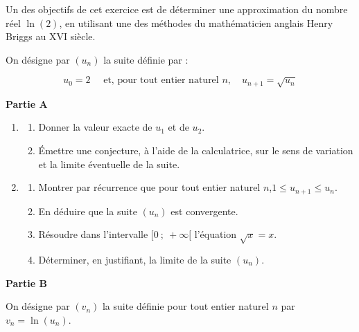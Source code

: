 \medskip

Un des objectifs de cet exercice est de déterminer une approximation du nombre réel $\ln(2)$, en utilisant une des méthodes du mathématicien anglais Henry Briggs au XVI siècle.

\bigskip

On désigne par $\left(u_{n}\right)$ la suite définie par :

\[u_{0}=2 \quad \text { et, pour tout entier naturel } n,\quad  u_{n+1}=\sqrt{u_{n}}\]

\medskip

\textbf{Partie A}

\medskip

\begin{enumerate}
\item 
	\begin{enumerate}
		\item Donner la valeur exacte de $u_{1}$ et de $u_{2}$.
		\item Émettre une conjecture, à l'aide de la calculatrice, sur le sens de variation et la limite éventuelle de la suite.
	\end{enumerate}
\item 
	\begin{enumerate}
		\item Montrer par récurrence que pour tout entier naturel $n$,\quad $1 \leqslant u_{n+1} \leqslant u_{n}$.
		\item En déduire que la suite $\left(u_{n}\right)$ est convergente.
		\item Résoudre dans l'intervalle $[0~;~+\infty[$ l'équation $\sqrt{x} =x$.
		\item Déterminer, en justifiant, la limite de la suite $\left(u_{n}\right)$.
	\end{enumerate}
\end{enumerate}

\medskip

\textbf{Partie B}

\medskip
	On désigne par $\left(v_{n}\right)$ la suite définie pour tout entier naturel $n$ par $v_{n}=\ln \left(u_{n}\right)$.

\medskip


